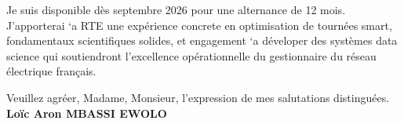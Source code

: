 \documentclass[a4paper,11pt]{article}
\begin{document}
\vspace{0.8em}\noindent Je suis disponible d\`es septembre 2026 pour une alternance de 12 mois. J'apporterai `a RTE une exp\'erience concrete en optimisation de tournées smart, fondamentaux scientifiques solides, et engagement `a d\'eveloper des syst\`emes data science qui soutiendront l'excellence op\'erationnelle du gestionnaire du r\'eseau \'electrique fran\c cais.

\vspace{1.5em}\noindent Veuillez agr\'eer, Madame, Monsieur, l'expression de mes salutations distingu\'ees.
\vspace{2em}\noindent \textbf{Lo\"ic Aron MBASSI EWOLO}
\end{document}

